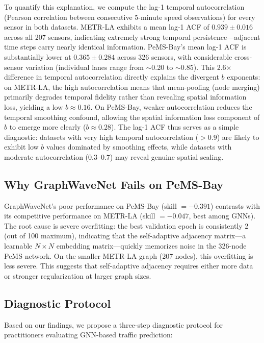 \documentclass[letterpaper]{article}
\begin{document}
To quantify this explanation, we compute the lag-1 temporal autocorrelation (Pearson correlation between consecutive 5-minute speed observations) for every sensor in both datasets. METR-LA exhibits a mean lag-1 ACF of $0.939 \pm 0.016$ across all 207 sensors, indicating extremely strong temporal persistence---adjacent time steps carry nearly identical information. PeMS-Bay's mean lag-1 ACF is substantially lower at $0.365 \pm 0.284$ across 326 sensors, with considerable cross-sensor variation (individual lanes range from $\sim$0.20 to $\sim$0.85). This 2.6$\times$ difference in temporal autocorrelation directly explains the divergent $b$ exponents: on METR-LA, the high autocorrelation means that mean-pooling (node merging) primarily degrades temporal fidelity rather than revealing spatial information loss, yielding a low $b \approx 0.16$. On PeMS-Bay, weaker autocorrelation reduces the temporal smoothing confound, allowing the spatial information loss component of $b$ to emerge more clearly ($b \approx 0.28$). The lag-1 ACF thus serves as a simple diagnostic: datasets with very high temporal autocorrelation ($> 0.9$) are likely to exhibit low $b$ values dominated by smoothing effects, while datasets with moderate autocorrelation ($0.3$--$0.7$) may reveal genuine spatial scaling.

\subsection{Why GraphWaveNet Fails on PeMS-Bay}

GraphWaveNet's poor performance on PeMS-Bay (skill $= -0.391$) contrasts with its competitive performance on METR-LA (skill $= -0.047$, best among GNNs). The root cause is severe overfitting: the best validation epoch is consistently 2 (out of 100 maximum), indicating that the self-adaptive adjacency matrix---a learnable $N \times N$ embedding matrix---quickly memorizes noise in the 326-node PeMS network. On the smaller METR-LA graph (207 nodes), this overfitting is less severe. This suggests that self-adaptive adjacency requires either more data or stronger regularization at larger graph sizes.

\subsection{Diagnostic Protocol}

Based on our findings, we propose a three-step diagnostic protocol for practitioners evaluating GNN-based traffic prediction:
\end{document}
